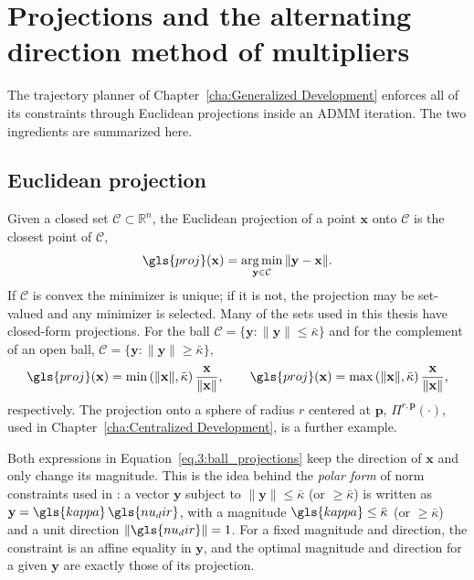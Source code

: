 \section{Projections and the alternating direction method of multipliers} \label{sec.3:ADMM}

The trajectory planner of Chapter~\ref{cha:Generalized Development} enforces all of its constraints through Euclidean projections inside an \gls{ADMM} iteration. The two ingredients are summarized here.

\subsection{Euclidean projection}

Given a closed set $\mathcal{C}\subset\mathbb{R}^n$, the Euclidean projection of a point $\mathbf{x}$ onto $\mathcal{C}$ is the closest point of $\mathcal{C}$,
\begin{equation}
    \gls{proj}(\mathbf{x}) = \operatorname*{arg\,min}_{\mathbf{y}\in\mathcal{C}} \|\mathbf{y}-\mathbf{x}\|.
    \label{eq.3:projection}
\end{equation}
If $\mathcal{C}$ is convex the minimizer is unique; if it is not, the projection may be set-valued and any minimizer is selected. Many of the sets used in this thesis have closed-form projections. For the ball $\mathcal{C}=\{\mathbf{y}:\|\mathbf{y}\|\le \bar{\kappa}\}$ and for the complement of an open ball, $\mathcal{C}=\{\mathbf{y}:\|\mathbf{y}\|\ge \bar{\kappa}\}$,
\begin{equation}
    \gls{proj}(\mathbf{x}) = \min\left(\|\mathbf{x}\|,\bar{\kappa}\right)\frac{\mathbf{x}}{\|\mathbf{x}\|},
    \qquad
    \gls{proj}(\mathbf{x}) = \max\left(\|\mathbf{x}\|,\bar{\kappa}\right)\frac{\mathbf{x}}{\|\mathbf{x}\|},
    \label{eq.3:ball_projections}
\end{equation}
respectively. The projection onto a sphere of radius $r$ centered at $\mathbf{p}$, $\Pi^{r,\mathbf{p}}(\cdot)$, used in Chapter~\ref{cha:Centralized Development}, is a further example.

Both expressions in Equation~\eqref{eq.3:ball_projections} keep the direction of $\mathbf{x}$ and only change its magnitude. This is the idea behind the \emph{polar form} of norm constraints used in \cite{10161063}: a vector $\mathbf{y}$ subject to $\|\mathbf{y}\|\le\bar{\kappa}$ (or $\ge\bar{\kappa}$) is written as $\mathbf{y}=\gls{kappa}\,\gls{nu_dir}$, with a magnitude $\gls{kappa}\le\bar{\kappa}$ (or $\ge\bar{\kappa}$) and a unit direction $\|\gls{nu_dir}\|=1$. For a fixed magnitude and direction, the constraint is an affine equality in $\mathbf{y}$, and the optimal magnitude and direction for a given $\mathbf{y}$ are exactly those of its projection.

